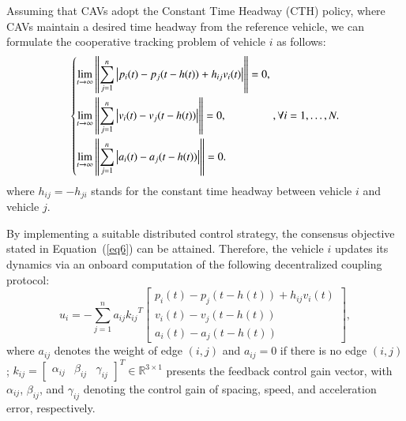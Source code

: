 \documentclass[journal]{IEEEtran}
\begin{document}
Assuming that CAVs adopt the Constant Time Headway (CTH) policy, where CAVs maintain a desired time headway from the reference vehicle, we can formulate the cooperative tracking problem of vehicle $i$ as follows:
\begin{equation}
  \left\{ \begin{gathered}
    \mathop {\lim }\limits_{t \to \infty } \left\| {\sum\limits_{j = 1}^n {\left| {{p_i}(t) - {p_j}(t - h(t)){\text{ + }}{h_{ij}}{v_i}(t)} \right|} } \right\| = 0 \hfill, \\
    \mathop {\lim }\limits_{t \to \infty } \left\| {\sum\limits_{j = 1}^n {\left| {{v_i}(t) - {v_j}(t - h(t))} \right|} } \right\| = 0, \hfill \\
    \mathop {\lim }\limits_{t \to \infty } \left\| {\sum\limits_{j = 1}^n {\left| {{a_i}(t) - {a_j}(t - h(t))} \right|} } \right\| = 0. \hfill \\
  \end{gathered}  \right.,\forall i = 1, \ldots ,N.
  \label{eq6}
\end{equation}
where $ {h_{ij}} =  - {h_{ji}} $ stands for the constant time headway between vehicle $i$ and vehicle $j$.

By implementing a suitable distributed control strategy, the consensus objective stated in Equation~(\ref{eq6}) can be attained. Therefore, the vehicle $i$ updates its dynamics via an onboard computation of the following decentralized coupling protocol:
\begin{equation}
  {u_i} =  - \sum\limits_{j = 1}^n {{a_{ij}}{k_{ij}}^T{{\left[ {\begin{array}{*{20}{c}}
              {{p_i}\left( t \right) - {p_j}\left( {t - h(t)} \right) + {h_{ij}}{v_i}\left( t \right)} \\ {{v_i}\left( t \right) - {v_j}\left( {t - h(t)} \right)} \\ {{a_i}\left( t \right) - {a_j}\left( {t - h(t)} \right)}
            \end{array}} \right]}}},
  \label{eq7}
\end{equation}
where $ {a_{ij}} $ denotes the weight of edge $ \left( {i,j} \right) $ and $ {a_{ij}} = 0 $ if there is no edge $ \left( {i,j} \right) $; $ {k_{ij}} = {\left[ {\begin{array}{*{20}{c}}
          {{\alpha _{ij}}} & {{\beta _{ij}}} & {{\gamma _{ij}}}
        \end{array}} \right]^T} \in {\mathbb{R}^{3 \times 1}} $ presents the feedback control gain vector, with $ {\alpha _{ij}} $, $ {\beta _{ij}} $, and $ {\gamma _{ij}} $ denoting the control gain of spacing, speed, and acceleration error, respectively.
\end{document}
